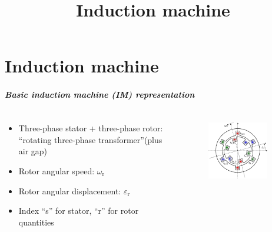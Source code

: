 \part{Induction machine}
\title[Induction machine]{Induction machine}  
\date{}  
\frame{\titlepage} 

\begin{frame}
	\frametitle{Basic induction machine (IM) representation}
    \begin{columns}
		\begin{column}{0.55\textwidth}
	       \begin{itemize}
            \item Three-phase stator + three-phase rotor: ``rotating three-phase transformer''\newline (plus air gap)
            \item Rotor angular speed: $\omega_\mathrm{r}$
            \item Rotor angular displacement: $\varepsilon_\mathrm{r}$
            \item Index ``s'' for stator, ``r'' for rotor quantities
           \end{itemize}
        \end{column}
        \begin{column}{0.45\textwidth}
            \begin{figure}
                \centering
                \includegraphics[width=0.85\textwidth]{fig/lec06/Simple_three_phase_induction_machine_lumped_coils.pdf}

\end{figure}
\end{column}
\end{columns}
\end{frame}

